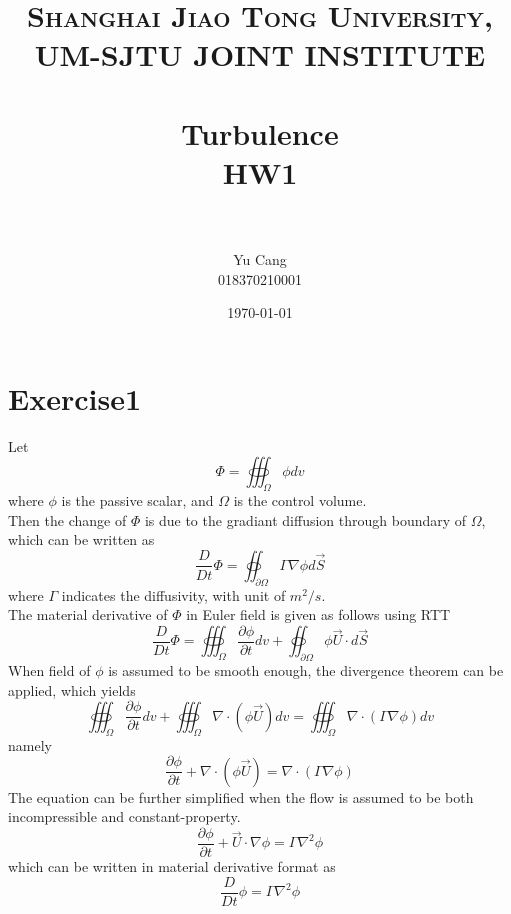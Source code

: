 \documentclass[paper=a4, fontsize=11pt]{scrartcl} %
\title{	
\normalfont \normalsize 
\textsc{Shanghai Jiao Tong University, UM-SJTU JOINT INSTITUTE} \\ [25pt] %
\horrule{0.5pt} \\[0.4cm] %
\huge Turbulence \\ HW1 \\ %
\horrule{2pt} \\[0.5cm] %
}
\author{Yu Cang \\ 018370210001} %
\date{\normalsize \today} %
\numberwithin{equation}{section} %
\numberwithin{figure}{section} %
\numberwithin{table}{section} %
\begin{document}
\maketitle %

\section{Exercise1}
  Let
  \begin{equation}
  	\Phi = \oiiint_\Omega \phi dv
  \end{equation}
  where $\phi$ is the passive scalar, and $\Omega$ is the control volume. \\
  Then the change of $\Phi$ is due to the gradiant diffusion through boundary of $\Omega$, which can be written as
  \begin{equation}
  	\frac{D}{Dt} \Phi = \oiint_{\partial \Omega} \Gamma \nabla \phi d\vec{S}
  \end{equation}
  where $\Gamma$ indicates the diffusivity, with unit of $m^2/s$.\\
  The material derivative of $\Phi$ in Euler field is given as follows using RTT
  \begin{equation}
  	\frac{D}{Dt} \Phi = \oiiint_\Omega \frac{\partial \phi}{\partial t} dv + \oiint_{\partial \Omega} \phi \vec{U} \cdot d\vec{S}
  \end{equation}
  When field of $\phi$ is assumed to be smooth enough, the divergence theorem can be applied, which yields
  \begin{equation}
  	\oiiint_\Omega \frac{\partial \phi}{\partial t} dv + \oiiint_\Omega \nabla \cdot (\phi \vec{U}) dv = \oiiint_\Omega \nabla \cdot (\Gamma \nabla \phi) dv
  \end{equation}
  namely
  \begin{equation}
  	\frac{\partial \phi}{\partial t} + \nabla \cdot (\phi \vec{U}) = \nabla \cdot (\Gamma \nabla \phi)
  \end{equation}
  The equation can be further simplified when the flow is assumed to be both incompressible and constant-property.
  \begin{equation}
  		\frac{\partial \phi}{\partial t} + \vec{U} \cdot \nabla \phi = \Gamma \nabla^2 \phi
  \end{equation}
  which can be written in material derivative format as
  \begin{equation}
  	\frac{D}{Dt}\phi = \Gamma \nabla^2 \phi
  \end{equation}
  
\end{document}
